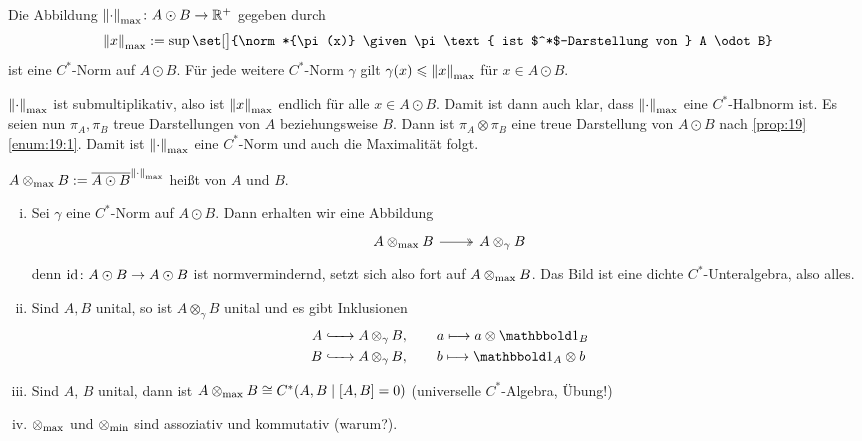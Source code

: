 \begin{definitionP}[{name=[{Max-Norm}]}]
	Die Abbildung $\norm*{\cdot }_{\max} \colon A \odot B \to \mathbb{R}^+$ gegeben durch
	\[
		\norm*{x}_{\max} := \sup \set[\big]{\norm*{\pi(x)} \given \pi \text{ ist $^*$-Darstellung von } A \odot B}
	\] 
	ist eine $C^*$-Norm auf $A \odot B$.
	Für jede weitere $C^*$-Norm $\gamma$ gilt $\gamma(x) \le \norm*{x}_{\max}$ für $x \in A \odot B$.
\end{definitionP}
\begin{beweis}
	$\norm*{\cdot}_{\max}$ ist submultiplikativ, also ist $\norm*{x}_{\max}$ endlich für alle $x \in A \odot B$.
	Damit ist dann auch klar, dass $\norm*{\cdot}_{\max}$ eine $C^*$-Halbnorm ist.
	Es seien nun $\pi_A, \pi_B$ treue Darstellungen von $A$ beziehungsweise $B$.
	Dann ist $\pi_A \otimes \pi_B$ eine treue Darstellung von $A \odot B$ nach \autoref{prop:19} \ref{enum:19:1}.
	Damit ist $\norm*{\cdot}_{\max}$ eine $C^*$-Norm und auch die Maximalität folgt.
\end{beweis}

\begin{definition}[{name=[{maximales Tensorprodukt}]}]
	$A \tensormax B := \overline{A \odot B}^{\norm*{\cdot }_{\max}}$ heißt  von $A$ und $B$. 
\end{definition}

\begin{bemerkung}
	\begin{enumerate}[(i)]
		\item Sei $\gamma$ eine $C^*$-Norm auf $A \odot B$.
		Dann erhalten wir eine Abbildung
		\[
			\begin{tikzcd}
				A \tensormax B \rar[two heads] & A \otimes_\gamma B
			\end{tikzcd}
		\]
		denn $\id \colon A \odot B \to A \odot B$ ist normvermindernd, setzt sich also fort auf $A \tensormax B$.
		Das Bild ist eine dichte $C^*$-Unteralgebra, also alles.
		\item Sind $A,B$ unital, so ist $A \otimes_\gamma B$ unital und es gibt Inklusionen
		\begin{align}
			A &\xhookrightarrow{\hspace{1.4em}} A \mathop{\otimes_\gamma} B , \qquad a \longmapsto a \otimes \ind_B \\
			B &\xhookrightarrow{\hspace{1.4em}} A \mathop{\otimes_\gamma} B , \qquad b \longmapsto \ind_A \otimes b
		\end{align}
		\item Sind $A$, $B$ unital, dann ist $A \tensormax B \cong C^* \enbrace*{A,B \mid \benbrace*{A,B}=0}$ (universelle $C^*$-Algebra, Übung!)
		\item $\tensormax $ und $\tensormin$ sind assoziativ und kommutativ (warum?).
	\end{enumerate}
\end{bemerkung}

